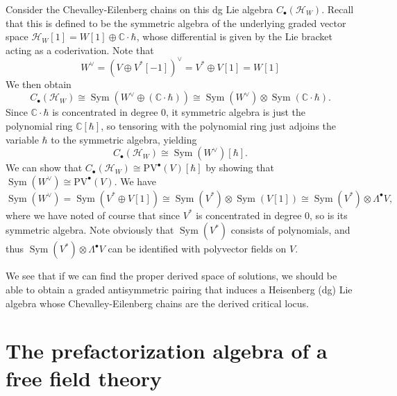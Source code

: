\begin{example}
Consider the Chevalley-Eilenberg chains on this dg Lie algebra $C_{\bullet} (\mathcal{H} _W)$. Recall that this is defined to be the symmetric algebra of the underlying graded vector space $\mathcal{H} _W[1]=W[1]\oplus \mathbb{C} \cdot \hbar $, whose differential is given by the Lie bracket acting as a coderivation. Note that
\[
	W^\vee =(V\oplus V^*[-1])^\vee =V^*\oplus V[1] = W[1]
\]
We then obtain
\[
	C_{\bullet} (\mathcal{H} _W) \cong \operatorname{Sym} (W^\vee \oplus (\mathbb{C} \cdot \hbar )) \cong \operatorname{Sym} (W^\vee )\otimes \operatorname{Sym} (\mathbb{C} \cdot \hbar )
.\]
Since $\mathbb{C} \cdot \hbar $ is concentrated in degree 0, it symmetric algebra is just the polynomial ring $\mathbb{C} [\hbar ]$, so tensoring with the polynomial ring just adjoins the variable $\hbar $ to the symmetric algebra, yielding
\[
	C_{\bullet} (\mathcal{H} _W) \cong \operatorname{Sym} (W^\vee )[\hbar ]
.\]
We can show that $C_{\bullet} (\mathcal{H} _W)\cong \mathrm{PV} ^{\bullet} (V)[\hbar ]$ by showing that $\operatorname{Sym} (W^\vee )\cong \mathrm{PV} ^{\bullet} (V)$. We have
\[
	\operatorname{Sym} (W^\vee )= \operatorname{Sym} (V^*\oplus V[1]) \cong \operatorname{Sym} (V^*)\otimes \operatorname{Sym} (V[1])\cong \operatorname{Sym} (V^*)\otimes \Lambda ^{\bullet} V,
\]
where we have noted of course that since $V^*$ is concentrated in degree 0, so is its symmetric algebra. Note obviously that $\operatorname{Sym} (V^*)$ consists of polynomials,  and thus $\operatorname{Sym} (V^*)\otimes \Lambda ^{\bullet} V$ can be identified with polyvector fields on $V$.

We see that if we can find the proper derived space of solutions, we should be able to obtain a graded antisymmetric pairing that induces a Heisenberg (dg) Lie algebra whose Chevalley-Eilenberg chains are the derived critical locus.
\end{example}



\section{The prefactorization algebra of a free field theory}

